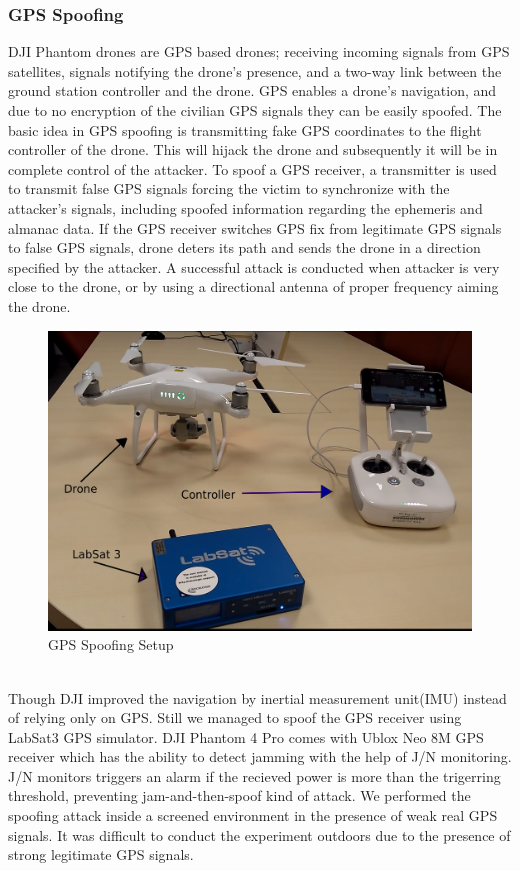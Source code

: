 \documentclass[conference]{IEEEtran}
\begin{document}
\subsubsection{GPS Spoofing}
DJI Phantom drones are GPS based drones; receiving incoming signals from GPS satellites, signals notifying the drone’s presence, and a two-way link between the ground station controller and the drone.
GPS enables a drone’s navigation, and due to no encryption of the civilian GPS signals they can be easily spoofed. The basic idea in GPS spoofing is transmitting fake GPS coordinates to the flight controller of the drone. This will hijack the drone and subsequently it will be in complete control of the attacker. To spoof a GPS receiver, a transmitter is used to transmit false GPS signals forcing the victim to synchronize with the attacker’s signals, including spoofed information regarding the ephemeris and almanac data. If the GPS receiver switches GPS fix from legitimate GPS signals to false GPS signals, drone deters its path and sends the drone in a direction specified by the attacker. A successful attack is conducted when attacker is very close to the drone, or by using a directional antenna of proper frequency aiming the drone.
\begin{figure}[h!]
	\centering
	\includegraphics[width=0.9\columnwidth]{images/setup}
	\caption{GPS Spoofing Setup}
	\label{fig:setup}
\end{figure}
\\
Though DJI improved the navigation by inertial measurement unit(IMU) instead of relying only on GPS. Still we managed to spoof the GPS receiver using LabSat3 GPS simulator\cite{labsat}. 
DJI Phantom 4 Pro comes with Ublox Neo 8M GPS receiver which has the ability to detect jamming with the help of J/N monitoring. J/N monitors triggers an alarm if the recieved power is more than the trigerring threshold, preventing jam-and-then-spoof kind of attack. We performed the spoofing attack inside a screened environment in the presence of weak real GPS signals. It was difficult to conduct the experiment outdoors due to the presence of strong legitimate GPS signals.
\end{document}
